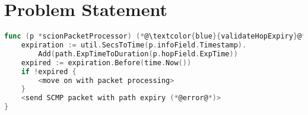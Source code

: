 \chapter{Problem Statement}
\label{ch:problem}

\begin{lstlisting}[language={Go}, morekeywords={}, caption={Pseudocode of hop expiry check in borderrouter.}, label={lst:hop-expiry}]
func (p *scionPacketProcessor) (*@\textcolor{blue}{validateHopExpiry}@*)() (processResult, error) {
	expiration := util.SecsToTime(p.infoField.Timestamp).
        Add(path.ExpTimeToDuration(p.hopField.ExpTime))
	expired := expiration.Before(time.Now())
	if !expired {
        <move on with packet processing>
    }
    <send SCMP packet with path expiry (*@error@*)>
}
\end{lstlisting}

